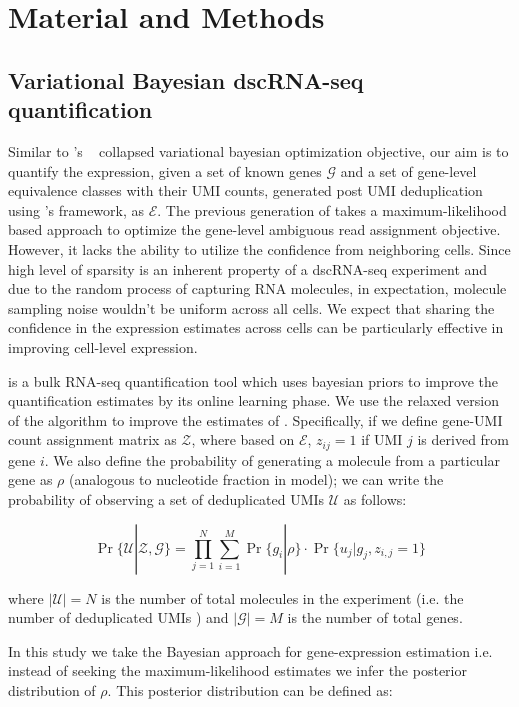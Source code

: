 \section{Material and Methods}
\label{sec:alv2_methods}

\subsection{Variational Bayesian dscRNA-seq quantification}
Similar to \salmon 's ~\citep{salmon} collapsed variational bayesian optimization 
objective, our aim is to quantify the expression, given a set of known genes $\mathcal{G}$ and a set
of gene-level equivalence classes with their UMI counts, generated post UMI deduplication using \alevin 's 
framework, as $\mathcal{E}$. The previous generation of \alevin takes a maximum-likelihood based approach to 
optimize the gene-level ambiguous read assignment objective. However, it lacks the ability to utilize the 
confidence from neighboring cells. Since high level of sparsity is an inherent property of a dscRNA-seq
experiment and due to the random process of capturing RNA molecules, in expectation, molecule 
sampling noise wouldn't be uniform across all cells. We expect that sharing the confidence in 
the expression estimates across cells can be particularly effective in improving cell-level expression. 

\salmon is a bulk RNA-seq quantification tool which uses bayesian priors to improve the 
quantification estimates by its online learning phase. We use the relaxed version of the algorithm 
to improve the estimates of \alevin. Specifically, if we define gene-UMI count 
assignment matrix as $\mathcal{Z}$, where based on $\mathcal{E}$, $z_{ij}=1$ if UMI $j$ is derived from 
gene $i$. We also define the probability of generating a molecule from a particular gene as $\rho$ (analogous to 
nucleotide fraction in \salmon model); we can write the probability of observing a set of deduplicated 
UMIs $\mathcal{U}$ as follows:

\begin{equation}
	\Pr\{\mathcal{U} | \mathcal{Z},\mathcal{G}\} = 
	\prod_{j=1}^{N}\sum_{i=1}^{M}\Pr\{ g_i | \rho \} \cdot \Pr\{ u_j | g_j, z_{i,j} = 1 \}
\end{equation}
 
 where $|\mathcal{U}| = N$ is the number of total molecules in the experiment (i.e. the number of 
 deduplicated UMIs ) and $|\mathcal{G}| = M$ is the number of total genes.
 
In this study we take the Bayesian approach for gene-expression estimation i.e. instead of 
seeking the maximum-likelihood estimates we infer the posterior distribution of $\rho$. 
This posterior distribution can be defined as:

